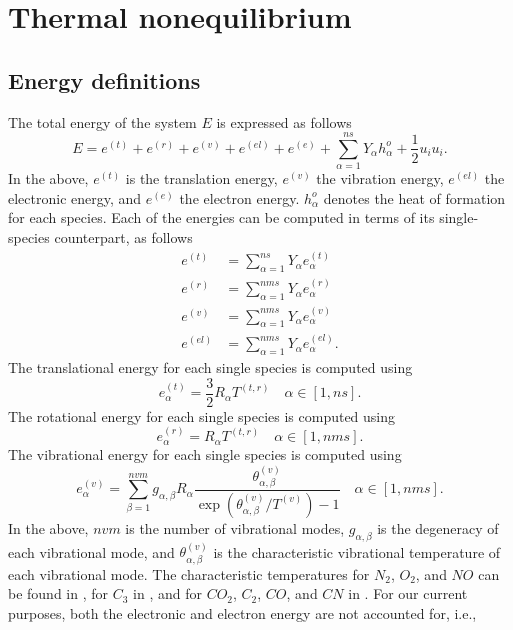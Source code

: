 \documentclass[oneside,a4paper,11pt]{report}
\begin{document}
\section{Thermal nonequilibrium}

\subsection{Energy definitions}
The total energy of the system $E$ is expressed as follows
\begin{equation}
E = e^{(t)} + e^{(r)} + e^{(v)} + e^{(el)} + e^{(e)} + \sum_{\alpha =1}^{ns} Y_\alpha h_\alpha^o + \frac{1}{2}u_i u_i .
\end{equation}
In the above, $e^{(t)}$ is the translation energy, $e^{(v)}$ the vibration energy, $e^{(el)}$ the electronic energy, and $e^{(e)}$ the electron energy. $h_\alpha^o$ denotes the heat of formation for each species. Each of the energies can be computed in terms of its single-species counterpart, as follows
\begin{align}
e^{(t)} &= \sum_{\alpha =1}^{ns} Y_\alpha e^{(t)}_\alpha \\
e^{(r)} & = \sum_{\alpha = 1}^{nms} Y_\alpha e^{(r)}_\alpha \\
e^{(v)} & = \sum_{\alpha =1}^{nms} Y_\alpha e^{(v)}_\alpha \\
e^{(el)} & = \sum_{\alpha =1}^{nms} Y_\alpha e^{(el)}_\alpha.
\end{align}
The translational energy for each single species is computed using
\begin{equation}
e^{(t)}_\alpha = \frac{3}{2} R_\alpha T^{(t,r)} \quad \alpha \in [1,ns].
\end{equation}
The rotational energy for each single species is computed using
\begin{equation}
e^{(r)}_\alpha = R_\alpha T^{(t,r)} \quad \alpha \in [1,nms].
\end{equation}
The vibrational energy for each single species is computed using
\begin{equation}
e^{(v)}_\alpha = \sum_{\beta = 1}^{nvm} g_{\alpha,\beta}R_\alpha \frac{\theta^{(v)}_{\alpha,\beta}}{\exp \left ( \theta^{(v)}_{\alpha,\beta} / T^{(v)} \right ) - 1} \quad \alpha \in [1,nms].
\end{equation}
In the above, $nvm$ is the number of vibrational modes, $g_{\alpha,\beta}$ is the degeneracy of each vibrational mode, and $\theta^{(v)}_{\alpha,\beta}$ is the characteristic vibrational temperature of each vibrational mode. The characteristic temperatures for $N_2$, $O_2$, and $NO$ can be found in \cite{park1990}, for $C_3$ in \cite{dolton1968}, and for $CO_2$, $C_2$, $CO$, and $CN$ in \cite{mcbride1963}. For our current purposes, both the electronic and electron energy are not accounted for, i.e.,
\end{document}
